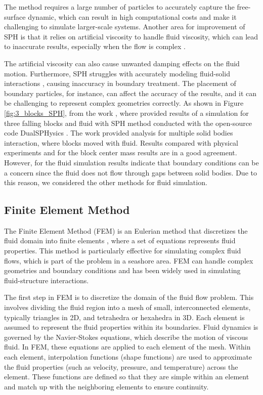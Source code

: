The method requires a large number of particles to accurately capture the free-surface dynamic, which can result in high computational costs and make it challenging to simulate larger-scale systems. Another area for improvement of SPH is that it relies on artificial viscosity to handle fluid viscosity, which can lead to inaccurate results, especially when the flow is complex \cite{zhang2018dualsphysics}. 

The artificial viscosity can also cause unwanted damping effects on the fluid motion. Furthermore, SPH struggles with accurately modeling fluid-solid interactions \cite{Dual_SPH2019accuracy}, causing inaccuracy in boundary treatment. The placement of boundary particles, for instance, can affect the accuracy of the results, and it can be challenging to represent complex geometries correctly. As shown in Figure \ref{fig:3_blocks_SPH}, from the work \cite{sarmakeeva2017meshfree}, where provided results of a simulation for three falling blocks and fluid with SPH method conducted with the open-source code DualSPHysics \cite{Dual_SPH2019accuracy}. The work provided analysis for multiple solid bodies interaction, where blocks moved with fluid. Results compared with physical experiments and for the block center mass results are in a good agreement. However, for the fluid simulation results indicate that boundary conditions can be a concern since the fluid does not flow through gaps between solid bodies. Due to this reason, we considered the other methods for fluid simulation.

\subsection{Finite Element Method}
The Finite Element Method (FEM) is an Eulerian method that discretizes the fluid domain into finite elements \cite{FEM}, where a set of equations represents fluid properties. This method is particularly effective for simulating complex fluid flows, which is part of the problem in a seashore area. FEM can handle complex geometries and boundary conditions and has been widely used in simulating fluid-structure interactions.

The first step in FEM is to discretize the domain of the fluid flow problem. This involves dividing the fluid region into a mesh of small, interconnected elements, typically triangles in 2D, and tetrahedra or hexahedra in 3D. Each element is assumed to represent the fluid properties within its boundaries. Fluid dynamics is governed by the Navier-Stokes equations, which describe the motion of viscous fluid. In FEM, these equations are applied to each element of the mesh. Within each element, interpolation functions (shape functions) are used to approximate the fluid properties (such as velocity, pressure, and temperature) across the element. These functions are defined so that they are simple within an element and match up with the neighboring elements to ensure continuity. 

